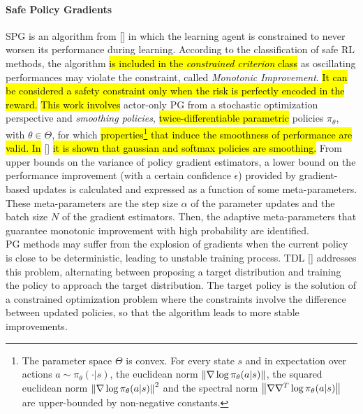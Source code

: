 \paragraph{Safe Policy Gradients} \label{subsec:safepg}
\acf{SPG} is an algorithm from [\cite{papini2019}] in which the learning agent is constrained to never worsen its performance during learning. According to the classification of safe \ac{RL} methods, the algorithm \hl{is included in the \emph{constrained criterion} class} as oscillating performances may violate the constraint, called \emph{Monotonic Improvement}. \hl{It can be considered a safety constraint only when the risk is perfectly encoded in the reward.} \hl{This work involves} actor-only \ac{PG} from a stochastic optimization perspective and \emph{smoothing policies}, \ie \hl{twice-differentiable parametric} policies $\pi_{\theta}$, with $\theta \in \Theta$, for which \hl{properties\footnote{The parameter space $\Theta$ is convex. For every state $s$ and in expectation over actions $a \sim \pi_{\theta}(\cdot|s)$, the euclidean norm $\left\|\nabla \log \pi_{\theta}(a|s)\right\|_{}$, the squared euclidean norm $\left\|\nabla \log \pi_{\theta}(a|s)\right\|_{}^2$ and the spectral norm $\left\|\nabla\nabla^T \log \pi_{\theta}(a|s)\right\|_{}$ are upper-bounded by non-negative constants.} that induce the smoothness of performance are valid. In} [\cite{papini2019}] \hl{it is shown that gaussian and softmax policies are smoothing.} From upper bounds on the variance of policy gradient estimators, a lower bound on the performance improvement (with a certain confidence $\epsilon$) provided by gradient-based updates is calculated and expressed as a function of some meta-parameters. These meta-parameters are the step size $\alpha$ of the parameter updates and the batch size $N$ of the gradient estimators. Then, the adaptive meta-parameters that guarantee monotonic improvement with high probability are identified.\\
\newline 
\ac{PG} methods may suffer from the explosion of gradients when the current policy is close to be deterministic, leading to unstable training process. \acf{TDL} [\cite{DBLP:journals/corr/abs-1905-11041}] addresses this problem, alternating between proposing a target distribution and training the policy to approach the target distribution. The target policy is the solution of a constrained optimization problem where the constraints involve the difference between updated policies, so that the algorithm leads to more stable improvements.